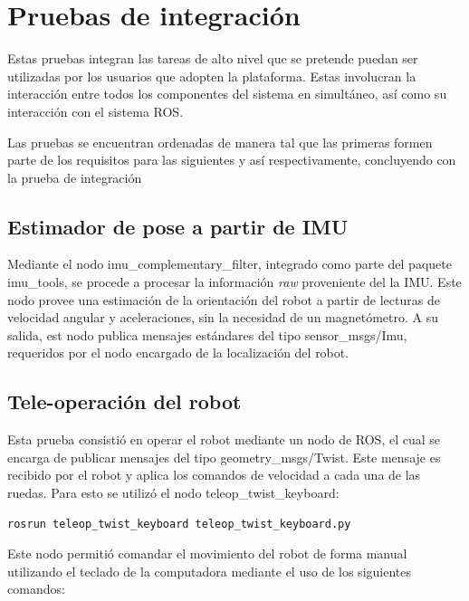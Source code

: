 \section{Pruebas de integración}

Estas pruebas integran las tareas de alto nivel que se pretende puedan ser utilizadas por los usuarios que adopten la plataforma. Estas involucran la interacción entre todos los componentes del sistema en simultáneo, así como su interacción con el sistema ROS.

Las pruebas se encuentran ordenadas de manera tal que las primeras formen parte de los requisitos para las siguientes y así respectivamente, concluyendo con la prueba de integración

\subsection{Estimador de pose a partir de IMU}

Mediante el nodo imu\_complementary\_filter, integrado como parte del paquete imu\_tools\protect\footnotemark, se procede a procesar la información \textit{raw} proveniente del la IMU. Este nodo provee una estimación de la orientación del robot a partir de lecturas de velocidad angular y aceleraciones, sin la necesidad de un magnetómetro. A su salida, est nodo publica mensajes estándares del tipo sensor\_msgs/Imu\protect\footnotemark, requeridos por el nodo encargado de la localización del robot.


\subsection{Tele-operación del robot}

Esta prueba consistió en operar el robot mediante un nodo de ROS, el cual se encarga de publicar mensajes del tipo geometry\_msgs/Twist\protect\footnotemark. Este mensaje es recibido por el robot y aplica los comandos de velocidad a cada una de las ruedas. Para esto se utilizó el nodo teleop\_twist\_keyboard:

\begin{lstlisting}[basicstyle=\ttfamily, keywords={}]
rosrun teleop_twist_keyboard teleop_twist_keyboard.py
\end{lstlisting}

Este nodo permitió comandar el movimiento del robot de forma manual utilizando el teclado de la computadora mediante el uso de los siguientes comandos:

